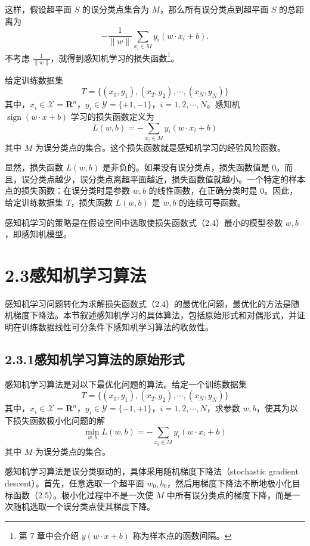 \documentclass[UTF8, 12pt, fontset=fandol, oneside]{ctexart}
\begin{document}
这样，假设超平面 $S$ 的误分类点集合为 $M$，那么所有误分类点到超平面 $S$ 的总距离为
\[
  -\frac{1}{\|w\|}\sum_{x_i\in M}y_i(w\cdot x_i+b).
\]
不考虑 $\frac{1}{\|w\|}$，就得到感知机学习的损失函数\footnote{第 7 章中会介绍 $y(w\cdot x+b)$ 称为样本点的函数间隔。}。

给定训练数据集
\[
  T=\{(x_1,y_1),(x_2,y_2),\cdots,(x_N,y_N)\}
\]
其中，$x_i\in\mathcal{X}=\mathbf{R}^n$，$y_i\in\mathcal{Y}=\{+1,-1\}$，$i=1,2,\cdots,N$。感知机 $\operatorname{sign}(w\cdot x+b)$ 学习的损失函数定义为
\begin{equation}
  L(w,b)=-\sum_{x_i\in M}y_i(w\cdot x_i+b)
  \tag{2.4}
\end{equation}
其中 $M$ 为误分类点的集合。这个损失函数就是感知机学习的经验风险函数。

显然，损失函数 $L(w,b)$ 是非负的。如果没有误分类点，损失函数值是 0。而且，误分类点越少，误分类点离超平面越近，损失函数值就越小。一个特定的样本点的损失函数：在误分类时是参数 $w,b$ 的线性函数，在正确分类时是 0。因此，给定训练数据集 $T$，损失函数 $L(w,b)$ 是 $w,b$ 的连续可导函数。

感知机学习的策略是在假设空间中选取使损失函数式（2.4）最小的模型参数 $w,b$，即感知机模型。

\section*{2.3\quad 感知机学习算法}

感知机学习问题转化为求解损失函数式（2.4）的最优化问题，最优化的方法是随机梯度下降法。本节叙述感知机学习的具体算法，包括原始形式和对偶形式，并证明在训练数据线性可分条件下感知机学习算法的收敛性。

\subsection*{2.3.1\quad 感知机学习算法的原始形式}

感知机学习算法是对以下最优化问题的算法。给定一个训练数据集
\[
  T=\{(x_1,y_1),(x_2,y_2),\cdots,(x_N,y_N)\}
\]
其中，$x_i\in\mathcal{X}=\mathbf{R}^n$，$y_i\in\mathcal{Y}=\{-1,+1\}$，$i=1,2,\cdots,N$，求参数 $w,b$，使其为以下损失函数极小化问题的解
\begin{equation}
  \min_{w,b}L(w,b)=-\sum_{x_i\in M}y_i(w\cdot x_i+b)
  \tag{2.5}
\end{equation}
其中 $M$ 为误分类点的集合。

感知机学习算法是误分类驱动的，具体采用随机梯度下降法（stochastic gradient descent）。首先，任意选取一个超平面 $w_0,b_0$，然后用梯度下降法不断地极小化目标函数（2.5）。极小化过程中不是一次使 $M$ 中所有误分类点的梯度下降，而是一次随机选取一个误分类点使其梯度下降。
\end{document}
